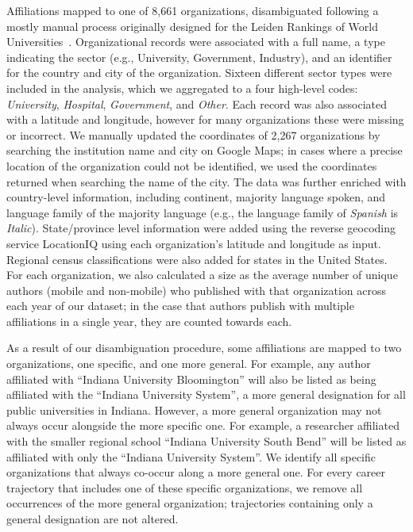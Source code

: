 \documentclass[12pt]{article} %
\begin{document}
Affiliations mapped to one of 8,661 organizations, disambiguated following a mostly manual process originally designed for the Leiden Rankings of World Universities~\autocite{waltman2012leidenrankings}. 
Organizational records were associated with a full name, a type indicating the sector (e.g., University, Government, Industry), and an identifier for the country and city of the organization. 
Sixteen different sector types were included in the analysis, which we aggregated to a four high-level codes: \textit{University}, \textit{Hospital}, \textit{Government}, and \textit{Other}. 
Each record was also associated with a latitude and longitude, however for many organizations these were missing or incorrect. We manually updated the coordinates of 2,267 organizations by searching the institution name and city on Google Maps;
in cases where a precise location of the organization could not be identified, we used the coordinates returned when searching the name of the city.
The data was further enriched with country-level information, including continent, majority language spoken, and language family of the majority language (e.g., the language family of \textit{Spanish} is \textit{Italic}).  
State/province level  information were added using the reverse geocoding service LocationIQ using each organization's latitude and longitude as input. 
Regional census classifications were also added for states in the United States.
For each organization, we also calculated a size as the average number of unique authors (mobile and non-mobile) who published with that organization across each year of our dataset;
in the case that authors publish with multiple affiliations in a single year, they are counted towards each. 

As a result of our disambiguation procedure, some affiliations are mapped to two organizations, one specific, and one more general.
For example, any author affiliated with ``Indiana University Bloomington'' will also be listed as being affiliated with the ``Indiana University System'', a more general designation for all public universities in Indiana. 
However, a more general organization may not always occur alongside the more specific one.
For example, a researcher affiliated with the smaller regional school ``Indiana University South Bend'' will be listed as affiliated with only the ``Indiana University System''. 
We identify all specific organizations that always co-occur along a more general one.
For every career trajectory that includes one of these specific organizations, we remove all occurrences of the more general organization;
trajectories containing only a general designation are not altered. 
\end{document}
